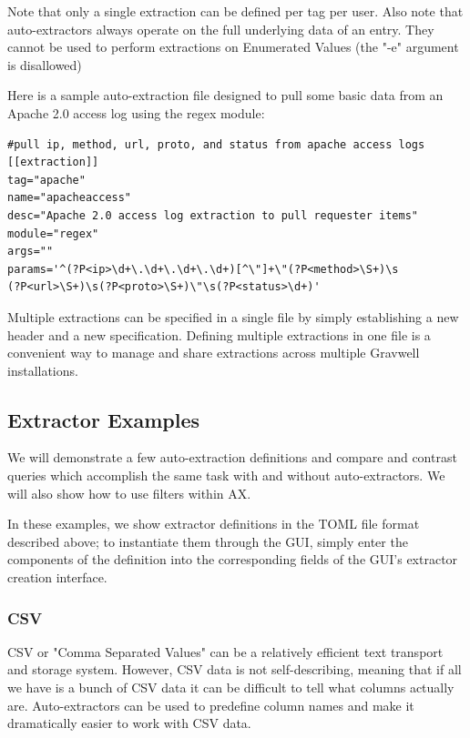 Note that only a single extraction can be defined per tag per user. Also note
that auto-extractors always operate on the full underlying data of an
entry. They cannot be used to perform extractions on Enumerated Values
(the "-e" argument is disallowed)

Here is a sample auto-extraction file designed to pull some basic data
from an Apache 2.0 access log using the regex module:

\begin{Verbatim}[breaklines=true]
#pull ip, method, url, proto, and status from apache access logs
[[extraction]]
tag="apache"
name="apacheaccess"
desc="Apache 2.0 access log extraction to pull requester items"
module="regex"
args=""
params='^(?P<ip>\d+\.\d+\.\d+\.\d+)[^\"]+\"(?P<method>\S+)\s
(?P<url>\S+)\s(?P<proto>\S+)\"\s(?P<status>\d+)'
\end{Verbatim}

Multiple extractions can be specified in a single file by simply
establishing a new \code{[[extraction]]} header and a new
specification. Defining multiple extractions in one file is a convenient
way to manage and share extractions across multiple Gravwell installations.

\subsection{Extractor Examples}

We will demonstrate a few auto-extraction definitions and compare and
contrast queries which accomplish the same task with and without
auto-extractors. We will also show how to use filters within AX.

In these examples, we show extractor definitions in the TOML file format
described above; to instantiate them through the GUI, simply enter the
components of the definition into the corresponding fields of the GUI's
extractor creation interface.

\subsubsection{CSV}

CSV or "Comma Separated Values" can be a relatively efficient text
transport and storage system. However, CSV data is not self-describing,
meaning that if all we have is a bunch of CSV data it can be difficult
to tell what columns actually are. Auto-extractors can be used to
predefine column names and make it dramatically easier to work with CSV
data.


